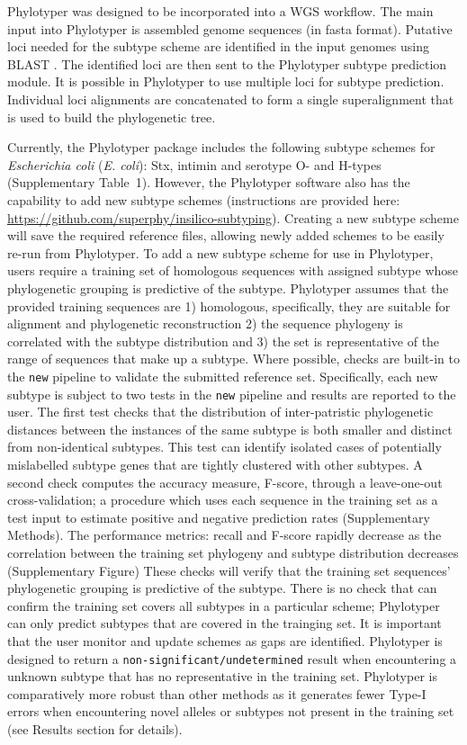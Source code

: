 \documentclass{bioinfo}
\begin{document}
Phylotyper was designed to be incorporated into a WGS workflow.  
The main input into Phylotyper is assembled genome sequences (in fasta format).  
Putative loci needed for the subtype scheme are identified in the input genomes using BLAST \citep{Camacho2009}.
The identified loci are then sent to the Phylotyper subtype prediction module.
It is possible in Phylotyper to use multiple loci for subtype prediction.
Individual loci alignments are concatenated to form a single superalignment that is used to build the phylogenetic tree.

Currently, the Phylotyper package includes the following subtype schemes for \emph{Escherichia coli} (\textit{E. coli}): Stx, intimin and serotype O- and H-types  (Supplementary Table~1).
However, the Phylotyper software also has the capability to add new subtype schemes (instructions are provided here: \url{https://github.com/superphy/insilico-subtyping}). 
Creating a new subtype scheme will save the required reference files, allowing newly added schemes to be easily re-run from Phylotyper.
To add a new subtype scheme for use in Phylotyper, users require a training set of homologous sequences with assigned subtype whose phylogenetic grouping is predictive of the subtype.
Phylotyper assumes that the provided training sequences are 1) homologous, specifically, they are suitable for alignment and phylogenetic reconstruction 2) the sequence phylogeny is correlated with the subtype distribution and 3) the set is representative of the range of sequences that make up a subtype.
Where possible, checks are built-in to the \texttt{new} pipeline to validate the submitted reference set.
Specifically, each new subtype is subject to two tests in the \texttt{new} pipeline and results are reported to the user.
The first test checks that the distribution of inter-patristic phylogenetic distances between the instances of the same subtype is both smaller and distinct from non-identical subtypes.
This test can identify isolated cases of potentially mislabelled subtype genes that are tightly clustered with other subtypes.
A second check computes the accuracy measure, F-score, through a leave-one-out cross-validation; a procedure which uses each sequence in the training set as a test input to estimate positive and negative prediction rates (Supplementary Methods).
The performance metrics: recall and F-score rapidly decrease as the correlation between the training set phylogeny and subtype distribution decreases (Supplementary Figure)
These checks will verify that the training set sequences' phylogenetic grouping is predictive of the subtype.
There is no check that can confirm the training set covers all subtypes in a particular scheme; Phylotyper can only predict subtypes that are covered in the trainging set.
It is important that the user monitor and update schemes as gaps are identified.
Phylotyper is designed to return a \texttt{non-significant/undetermined} result when encountering a unknown subtype that has no representative in the training set.
Phylotyper is comparatively more robust than other methods as it generates fewer Type-I errors when encountering novel alleles or subtypes not present in the training set (see Results section for details).
\end{document}
